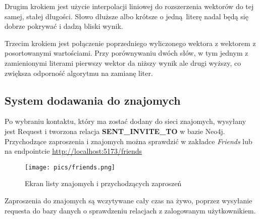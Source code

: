 \documentclass{article}
\begin{document}
Drugim krokiem jest użycie interpolacji liniowej do rozszerzenia wektorów
do tej samej, stałej długości. Słowo dłuższe albo krótsze o jedną literę
nadal będą się dobrze pokrywać i dadzą bliski wynik.

Trzecim krokiem jest połączenie poprzedniego wyliczonego wektora
z wektorem z posortowanymi wartościami. Przy porównywaniu dwóch słów,
w tym jednym z zamienionymi literami pierwszy wektor da niższy wynik
ale drugi wyższy, co zwiększa odporność algorytmu na zamianę liter.

\newpage
\subsection{System dodawania do znajomych}
Po wybraniu kontaktu, który ma zostać dodany do sieci znajomych, wysyłany jest Request i tworzona relacja \textbf{SENT\_INVITE\_TO} w bazie Neo4j. Przychodzące zaproszenia i znajomych można sprawdzić w zakładce \textit{Friends} lub na endpointcie \url{http://localhost:5173/friends}

\begin{figure}[h]
    \centering
    \texttt{[image: pics/friends.png]}
    \caption*{Ekran listy znajomych i przychodzących zaproszeń}
\end{figure}

Zaproszenia do znajomych są wczytywane cały czas na żywo, poprzez wysyłanie requesta do bazy danych o sprawdzeniu relacjach z zalogowanym użytkownikiem. 
\end{document}
